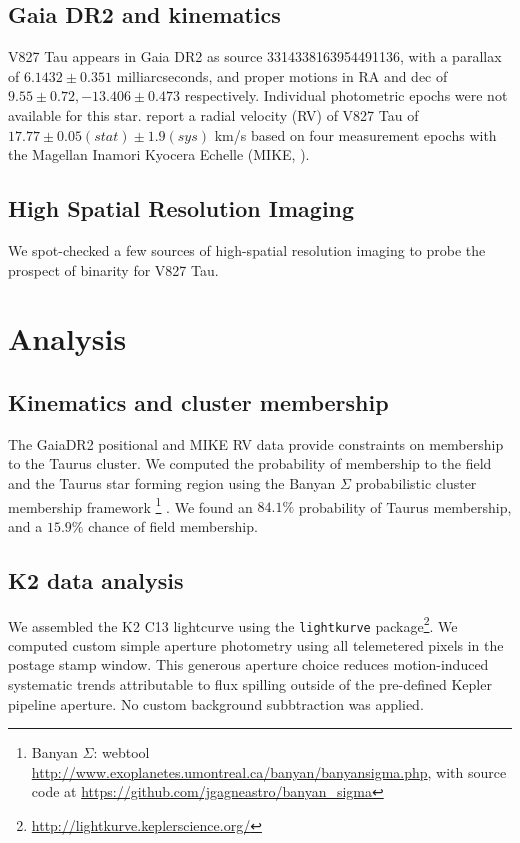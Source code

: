 \documentclass[twocolumn]{emulateapj}%
\begin{document}
\subsection{Gaia DR2 and kinematics} \label{sec:GaiaDR2}

V827 Tau appears in Gaia DR2 \citep{2016A&A...595A...1G, 2018A&A...616A...1G} as source 3314338163954491136, with a parallax of $6.1432 \pm 0.351 $ milliarcseconds, and proper motions in RA and dec of $9.55 \pm 0.72, -13.406 \pm 0.473$ respectively. Individual photometric epochs were not available for this star. \citet{nguyen12} report a radial velocity (RV) of V827 Tau of $17.77 \pm 0.05 (stat) \pm 1.9 (sys) $ km/s based on four measurement epochs with the Magellan Inamori Kyocera Echelle (MIKE, \citet{2003SPIE.4841.1694B}).

\subsection{High Spatial Resolution Imaging} \label{sec:imaging}
We spot-checked a few sources of high-spatial resolution imaging to probe the prospect of binarity for V827 Tau.



\section{Analysis}\label{sec:Analysis}

\subsection{Kinematics and cluster membership}
The GaiaDR2 positional and MIKE RV data provide constraints on membership to the Taurus cluster.  We computed the probability of membership to the field and the Taurus star forming region using the Banyan $\Sigma$ probabilistic cluster membership framework \footnote{Banyan $\Sigma$: webtool \url{http://www.exoplanetes.umontreal.ca/banyan/banyansigma.php}, with source code at \url{https://github.com/jgagneastro/banyan_sigma}} \citep{2018ApJ...856...23G}.  We found an $84.1\%$ probability of Taurus membership, and a $15.9\%$ chance of field membership.

\subsection{K2 data analysis}
We assembled the K2 C13 lightcurve using the \texttt{lightkurve} package\footnote{\url{http://lightkurve.keplerscience.org/}}.  We computed custom simple aperture photometry using all telemetered pixels in the postage stamp window.  This generous aperture choice reduces motion-induced systematic trends attributable to flux spilling outside of the pre-defined Kepler pipeline aperture.  No custom background subbtraction was applied.
\end{document}
